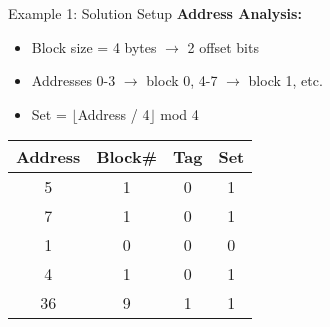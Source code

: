 \documentclass[aspectratio=169,12pt]{beamer}
\begin{document}
\begin{frame}{Example 1: Solution Setup}
\textbf{Address Analysis:}
\begin{itemize}
    \item Block size = 4 bytes $\rightarrow$ 2 offset bits
    \item Addresses 0-3 $\rightarrow$ block 0, 4-7 $\rightarrow$ block 1, etc.
    \item Set = $\lfloor$Address / 4$\rfloor$ mod 4
\end{itemize}

\begin{center}
\begin{tabular}{|c|c|c|c|}
\hline
\textbf{Address} & \textbf{Block\#} & \textbf{Tag} & \textbf{Set} \\
\hline
5 & 1 & 0 & 1 \\
7 & 1 & 0 & 1 \\
1 & 0 & 0 & 0 \\
4 & 1 & 0 & 1 \\
36 & 9 & 1 & 1 \\
\hline
\end{tabular}
\end{center}
\end{frame}
\end{document}
